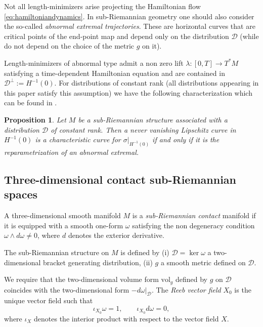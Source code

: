 \documentclass{amsart}
\theoremstyle{plain}
\newtheorem{proposition}[theorem]{Proposition}
\theoremstyle{definition}
\theoremstyle{remark}
\newcommand{\diff}{d}%
\newcommand{\sr}{sub-{R}ie\-man\-nian }
\newcommand{\distr}{\mathcal{D}}								%
\begin{document}
Not all length-minimizers arise projecting the Hamiltonian flow \eqref{eq:hamiltoniandynamics}. In \sr geometry one should also consider the so-called \emph{abnormal extremal trajectories}. 
These are horizontal curves that are critical points of the end-point map and depend only on the distribution $\distr$ (while do not depend on the choice of the metric $g$ on it). 

Length-minimizers of abnormal type admit a non zero lift $\lambda:[0,T]\to T^*M$ satisfying a time-dependent Hamiltonian equation and are contained in $\distr^{\perp}:=H^{-1}(0)$. For distributions of constant rank (all distributions appearing in this paper satisfy this assumption) we have the following characterization which can be found in \cite[Section~4.3]{thebook}.
\begin{proposition} \label{p:sympzero}
Let $M$ be a sub-Riemannian structure associated with a distribution $\distr$ of constant rank. Then a never vanishing Lipschitz curve in $H^{-1}(0)$ is a characteristic curve for $\sigma|_{H^{-1}(0)}$ if and only if it is the reparametrization of an abnormal extremal.
\end{proposition}
 


\subsection{Three-dimensional contact sub-{R}iemannian spaces}
\label{prel:contact}


A three-dimensional smooth manifold $M$ is a \emph{\sr contact} manifold if it is equipped with a smooth one-form $\omega$ satisfying the non degeneracy condition $\omega\wedge\diff\omega\neq 0$,
where $\diff$ denotes the exterior derivative.

The \sr structure on $M$ is defined by
(i) $\distr=\ker\omega$ a two-dimensional bracket generating distribution,
(ii) $g$ a smooth metric defined on $\distr$.  

We require that the two-dimensio\-nal volume form $\mathrm{vol}_g$ defined by $g$ on $\distr$ coincides with the two-dimensional form $-\diff \omega|_{\distr}$.
The \emph{Reeb vector field} $X_{0}$ is the unique vector field such that
\begin{equation}
\label{eq:reeb}
\iota_{X_{0}}\omega=1,\qquad \iota_{X_{0}}\diff\omega=0,
\end{equation}
where $\iota_{X}$ denotes the interior product with respect to the vector field $X$. 
\end{document}

